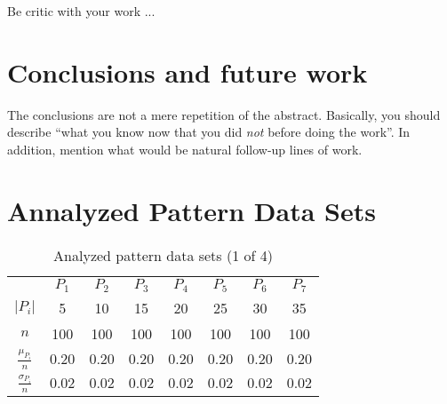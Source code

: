 \documentclass[anon]{CI}
\begin{document}
Be critic with your work ...

\section{Conclusions and future work}

The conclusions are not a mere repetition of the abstract. Basically, you should describe ``what you know now that you did \emph{not} before doing the work''. In addition, mention what would be natural follow-up lines of work.






\appendix

\section{Annalyzed Pattern Data Sets}\label{AppA}



\begin{table}[H]
	\centering
	\def\arraystretch{1.5}
	\begin{tabular}{cccccccc}
		
		& $P_{1}$  & $P_{2}$  & $P_{3}$  & $P_{4}$  & $P_{5}$  & $P_{6}$  & $P_{7}$  \\ \cline{2-8}
		$\left|P_i\right|$  & 5  & 10  & 15  & 20  & 25  & 30  & 35 \\
		$n$  & 100  & 100  & 100  & 100  & 100  & 100  & 100 \\
		$\frac{\mu_{P_i}}{n}$  & $0.20$  & $0.20$  & $0.20$  & $0.20$  & $0.20$  & $0.20$  & $0.20$ \\
		$\frac{\sigma_{P_i}}{n}$  & $0.02$  & $0.02$  & $0.02$  & $0.02$  & $0.02$  & $0.02$  & $0.02$ 
	\end{tabular}
	\caption{Analyzed pattern data sets (1 of 4)}
\end{table}
\end{document}
